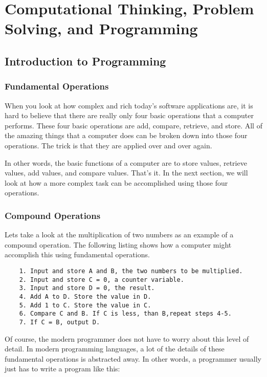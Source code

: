 \chapter{Computational Thinking, Problem Solving, and Programming}

\section{Introduction to Programming}

\subsection*{Fundamental Operations}
When you look at how complex and rich today's software applications are, it is hard to believe that there are really only four basic operations that a computer performs. These four basic operations are add, compare, retrieve, and store. All of the amazing things that a computer does can be broken down into those four operations. The trick is that they are applied over and over again. 

In other words, the basic functions of a computer are to store values, retrieve values, add values, and compare values. That's it. In the next section, we will look at how a more complex task can be accomplished using those four operations.

\subsection*{Compound Operations}
Lets take a look at the multiplication of two numbers as an example of a compound operation. The following listing shows how a computer might accomplish this using fundamental operations.

	\begin{verbatim}
	1. Input and store A and B, the two numbers to be multiplied.
	2. Input and store C = 0, a counter variable.
	3. Input and store D = 0, the result.
	4. Add A to D. Store the value in D.
	5. Add 1 to C. Store the value in C.
	6. Compare C and B. If C is less, than B,repeat steps 4-5.
	7. If C = B, output D.
	\end{verbatim}
	
	Of course, the modern programmer does not have to worry about this level of detail. In modern programming languages, a lot of the details of these fundamental operations is abstracted away. In other words, a programmer usually just has to write a program like this:
	
